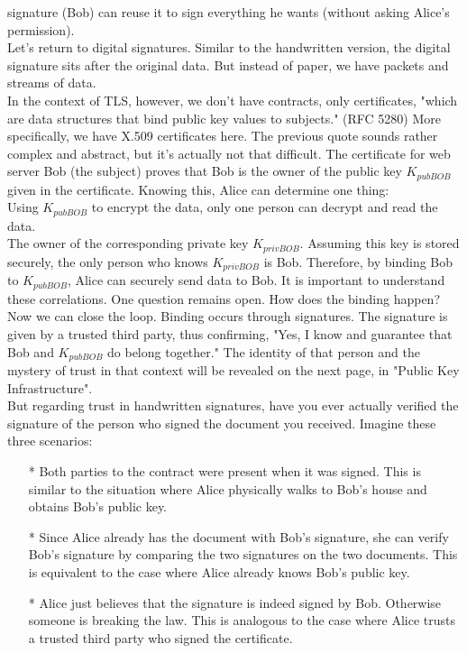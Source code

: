 signature (Bob) can reuse it to sign everything he wants (without asking Alice's permission).
\\
Let's return to digital signatures. Similar to the handwritten version, the digital 
signature sits after the original data. But instead of paper, we have packets and streams 
of data.
\\
In the context of TLS, however, we don't have contracts, only certificates, "which are 
data structures that bind public key values to subjects." (RFC 5280) More specifically, 
we have X.509 certificates here. The previous quote sounds rather complex and abstract, 
but it's actually not that difficult. The certificate for web server Bob (the subject) 
proves that Bob is the owner of the public key $K_{pubBOB}$ given in the certificate. 
Knowing this, Alice can determine one thing:
\\
Using $K_{pubBOB}$ to encrypt the data, only one person can decrypt and read the data.
\\
The owner of the corresponding private key $K_{privBOB}$. 
Assuming this key is stored securely, the only person who knows $K_{privBOB}$ is Bob. 
Therefore, by binding Bob to $K_{pubBOB}$, Alice can securely send data to Bob. It is 
important to understand these correlations. One question remains open. How does the binding happen?
\\
Now we can close the loop. 
Binding occurs through signatures. The signature is given by a trusted third party, 
thus confirming, "Yes, I know and guarantee that Bob and $K_{pubBOB}$ do belong together." 
The identity of that person and the mystery of trust in that context will be revealed 
on the next page, in "Public Key Infrastructure".
\\
But regarding trust in handwritten signatures, have you ever actually verified the 
signature of the person who signed the document you received. Imagine these three scenarios:
\begin{itemize}
    \item[*] Both parties to the contract were present when it was signed. This is similar to the situation where Alice physically walks to Bob's house and obtains Bob's public key.
    \item[*] Since Alice already has the document with Bob's signature, she can verify Bob's signature by comparing the two signatures on the two documents. This is equivalent to the case where Alice already knows Bob's public key.
    \item[*] Alice just believes that the signature is indeed signed by Bob. Otherwise someone is breaking the law. This is analogous to the case where Alice trusts a trusted third party who signed the certificate.
\end{itemize}

